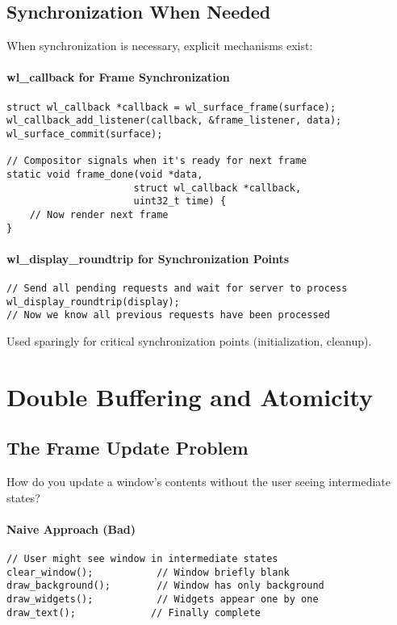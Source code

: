 \subsection{Synchronization When Needed}

When synchronization is necessary, explicit mechanisms exist:

\paragraph{wl\_callback for Frame Synchronization}
\begin{lstlisting}[style=cstyle, caption=Frame Callbacks]
struct wl_callback *callback = wl_surface_frame(surface);
wl_callback_add_listener(callback, &frame_listener, data);
wl_surface_commit(surface);

// Compositor signals when it's ready for next frame
static void frame_done(void *data,
                      struct wl_callback *callback,
                      uint32_t time) {
    // Now render next frame
}
\end{lstlisting}

\paragraph{wl\_display\_roundtrip for Synchronization Points}
\begin{lstlisting}[style=cstyle, caption=Forced Synchronization]
// Send all pending requests and wait for server to process
wl_display_roundtrip(display);
// Now we know all previous requests have been processed
\end{lstlisting}

Used sparingly for critical synchronization points (initialization, cleanup).

\section{Double Buffering and Atomicity}

\subsection{The Frame Update Problem}

How do you update a window's contents without the user seeing intermediate states?

\paragraph{Naive Approach (Bad)}
\begin{lstlisting}[style=cstyle, caption=Non-Atomic Updates]
// User might see window in intermediate states
clear_window();           // Window briefly blank
draw_background();        // Window has only background
draw_widgets();           // Widgets appear one by one
draw_text();             // Finally complete
\end{lstlisting}

